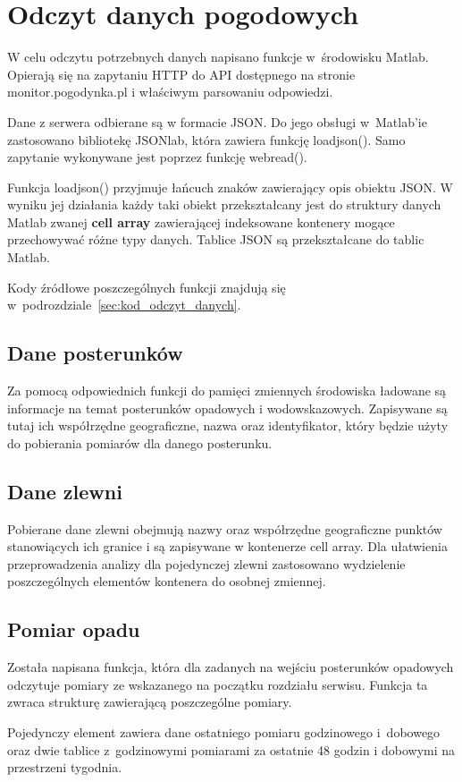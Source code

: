 \chapter{Odczyt danych pogodowych}
W celu odczytu potrzebnych danych napisano funkcje w~środowisku Matlab. Opierają się na zapytaniu HTTP do API dostępnego na stronie monitor.pogodynka.pl i właściwym parsowaniu odpowiedzi.

Dane z serwera odbierane są w formacie JSON. Do jego obsługi w~Matlab'ie zastosowano bibliotekę JSONlab, która zawiera funkcję loadjson(). Samo zapytanie wykonywane jest poprzez funkcję webread().

Funkcja loadjson() przyjmuje łańcuch znaków zawierający opis obiektu JSON. W wyniku jej działania każdy taki obiekt przekształcany jest do struktury danych Matlab zwanej \textbf{cell array} zawierającej indeksowane kontenery mogące przechowywać różne typy danych. Tablice JSON są przekształcane do tablic Matlab. 

Kody źródłowe poszczególnych funkcji znajdują się w~podrozdziale~\ref{sec:kod_odczyt_danych}.
\section{Dane posterunków}
Za pomocą odpowiednich funkcji do pamięci zmiennych środowiska ładowane są informacje na temat posterunków opadowych i wodowskazowych. Zapisywane są tutaj ich współrzędne geograficzne, nazwa oraz identyfikator, który będzie użyty do pobierania pomiarów dla danego posterunku.

\section{Dane zlewni}
Pobierane dane zlewni obejmują nazwy oraz współrzędne geograficzne punktów stanowiących ich granice i są zapisywane w kontenerze cell array. Dla ułatwienia przeprowadzenia analizy dla pojedynczej zlewni zastosowano wydzielenie poszczególnych elementów kontenera do osobnej zmiennej.

\section{Pomiar opadu}
\label{sec:pomiar_opadu}
Została napisana funkcja, która dla zadanych na wejściu posterunków opadowych odczytuje pomiary ze wskazanego na początku rozdziału serwisu. Funkcja ta zwraca strukturę zawierającą poszczególne pomiary.

Pojedynczy element zawiera dane ostatniego pomiaru godzinowego i~dobowego oraz dwie tablice z~godzinowymi pomiarami za ostatnie 48 godzin i dobowymi na przestrzeni tygodnia.

